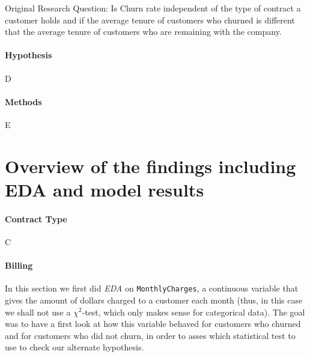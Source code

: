 \documentclass[man, floatsintext]{apa6}
\begin{document}
Original Research Question:
Is Churn rate independent of the type of contract a customer holds and if the average tenure of customers who churned is different that the average tenure of customers who are remaining with the company.

\paragraph{Hypothesis}

D

\paragraph{Methods}

E

\section{Overview of the findings including EDA and model results}

\paragraph{Contract Type}

C

\paragraph{Billing}

In this section we first did \textit{EDA} on \texttt{MonthlyCharges}, a continuous variable that gives the amount of dollars charged to a customer each month (thus, in this case we shall not use a $\chi^2$-test, which only makes sense for categorical data). The goal was to have a first look at how this variable behaved for customers who churned and for customers who did not churn, in order to asses which statistical test to use to check our alternate hypothesis. 

\hspace{0.5mm}
\end{document}

